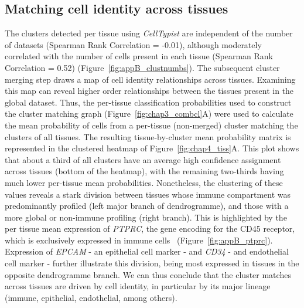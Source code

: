 \subsection{Matching cell identity across tissues}
\label{section_tissues}
The clusters detected per tissue using \textit{CellTypist} are independent of the number of datasets (Spearman Rank Correlation = -0.01), although moderately correlated with the number of cells present in each tissue (Spearman Rank Correlation = 0.52) (Figure~\ref{fig:appB_clustnumbs}). The subsequent cluster merging step draws a map of cell identity relationships across tissues. Examining this map can reveal higher order relationships between the tissues present in the global dataset. Thus, the per-tissue classification probabilities used to construct the cluster matching graph (Figure~\ref{fig:chap3_combcl}A) were used to calculate the mean probability of cells from a per-tissue (non-merged) cluster matching the clusters of all tissues. The resulting tissue-by-cluster mean probability matrix is represented in the clustered heatmap of Figure~\ref{fig:chap4_tiss}A. This plot shows that about a third of all clusters have an average high confidence assignment across tissues (bottom of the heatmap), with the remaining two-thirds having much lower per-tissue mean probabilities. Nonetheless, the clustering of these values reveals a stark division between tissues whose immune compartment was predominantly profiled (left major branch of dendrogramme), and those with a more global or non-immune profiling (right branch). This is highlighted by the per tissue mean expression of \textit{PTPRC}, the gene encoding for the CD45 receptor, which is exclusively expressed in immune cells~\citep{altin_role_1997} (Figure~\ref{fig:appB_ptprc}). Expression of \textit{EPCAM} - an epithelial cell marker - and \textit{CD34} - and endothelial cell marker - further illustrate this division, being most expressed in tissues in the opposite dendrogramme branch. We can thus conclude that the cluster matches across tissues are driven by cell identity, in particular by its major lineage (immune, epithelial, endothelial, among others).

